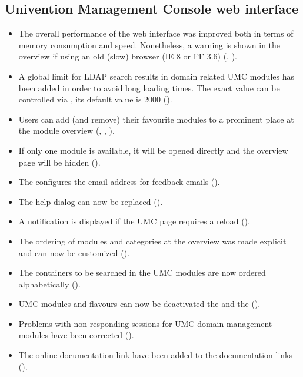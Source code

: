 \subsection{Univention Management Console web interface}
\begin{itemize}
\item The overall performance of the web interface was improved both in terms
  of memory consumption and speed. Nonetheless, a warning is shown in the
  overview if using an old (slow) browser (IE 8 or FF 3.6)
  (, ).
\item A global limit for LDAP search results in domain related UMC modules
  has been added in order to avoid long loading times. The exact value can
  be controlled via , its
  default value is 2000 ().
\item Users can add (and remove) their favourite modules to a
  prominent place at the module overview (,
  , ).
\item If only one module is available, it will be opened directly and
  the overview page will be hidden ().
\item The  configures the email address
  for feedback emails ().
\item The help dialog can now be replaced ().
\item A notification is displayed if the UMC page requires a reload
  ().
\item The ordering of modules and categories at the overview was made
  explicit and can now be customized ().
\item The containers to be searched in the UMC modules are now ordered
  alphabetically ().
\item UMC modules and flavours can now be deactivated the
   and the
  ().
\item Problems with non-responding sessions for UMC domain management
  modules have been corrected ().
\item The online documentation link have been added to the documentation links ().
\end{itemize}

